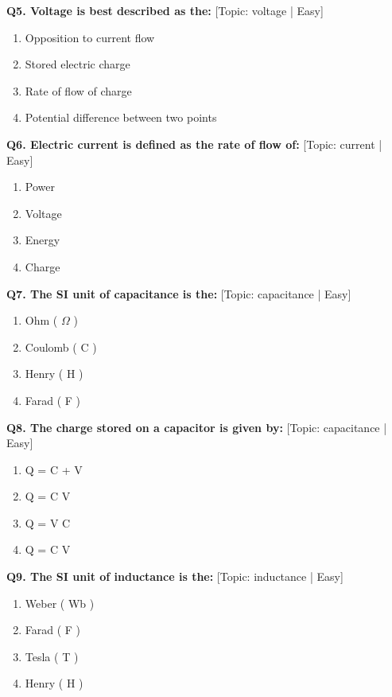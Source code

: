 \noindent\textbf{Q5. Voltage is best described as the:} \hfill [Topic: voltage | Easy]
\begin{enumerate}[label=(\alph*),topsep=2pt,itemsep=1pt,partopsep=0pt,parsep=0pt]
    \item {Opposition to current flow}
    \item {Stored electric charge}
    \item {Rate of flow of charge}
    \item {Potential difference between two points}
\end{enumerate}
\vspace{2mm}

\noindent\textbf{Q6. Electric current is defined as the rate of flow of:} \hfill [Topic: current | Easy]
\begin{enumerate}[label=(\alph*),topsep=2pt,itemsep=1pt,partopsep=0pt,parsep=0pt]
    \item {Power}
    \item {Voltage}
    \item {Energy}
    \item {Charge}
\end{enumerate}
\vspace{2mm}

\noindent\textbf{Q7. The SI unit of capacitance is the:} \hfill [Topic: capacitance | Easy]
\begin{enumerate}[label=(\alph*),topsep=2pt,itemsep=1pt,partopsep=0pt,parsep=0pt]
    \item {Ohm ( $\Omega$ )}
    \item {Coulomb ( C )}
    \item {Henry ( H )}
    \item {Farad ( F )}
\end{enumerate}
\vspace{2mm}

\noindent\textbf{Q8. The charge stored on a capacitor is given by:} \hfill [Topic: capacitance | Easy]
\begin{enumerate}[label=(\alph*),topsep=2pt,itemsep=1pt,partopsep=0pt,parsep=0pt]
    \item {Q = C + V}
    \item {Q = C V}
    \item {Q = V C}
    \item {Q = C V}
\end{enumerate}
\vspace{2mm}

\noindent\textbf{Q9. The SI unit of inductance is the:} \hfill [Topic: inductance | Easy]
\begin{enumerate}[label=(\alph*),topsep=2pt,itemsep=1pt,partopsep=0pt,parsep=0pt]
    \item {Weber ( Wb )}
    \item {Farad ( F )}
    \item {Tesla ( T )}
    \item {Henry ( H )}
\end{enumerate}
\vspace{2mm}

